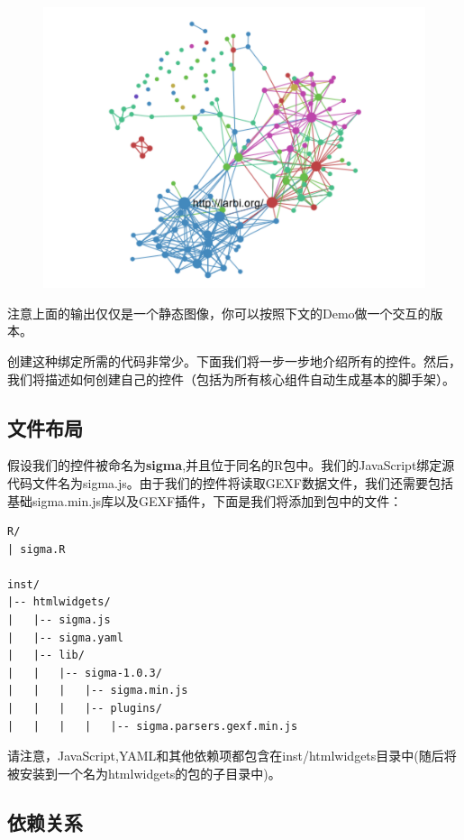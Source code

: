 \documentclass[]{book}
\theoremstyle{definition}
\theoremstyle{definition}
\theoremstyle{definition}
\theoremstyle{remark}
\begin{document}
\begin{figure}
\centering
\includegraphics{pic/ch1_1.png}
\caption{}
\end{figure}

注意上面的输出仅仅是一个静态图像，你可以按照下文的Demo做一个交互的版本。

创建这种绑定所需的代码非常少。下面我们将一步一步地介绍所有的控件。然后，我们将描述如何创建自己的控件（包括为所有核心组件自动生成基本的脚手架）。

\subsection{文件布局}

假设我们的控件被命名为\textbf{sigma},并且位于同名的R包中。我们的JavaScript绑定源代码文件名为sigma.js。由于我们的控件将读取GEXF数据文件，我们还需要包括基础sigma.min.js库以及GEXF插件，下面是我们将添加到包中的文件：

\begin{verbatim}
R/
| sigma.R

inst/
|-- htmlwidgets/
|   |-- sigma.js
|   |-- sigma.yaml
|   |-- lib/
|   |   |-- sigma-1.0.3/
|   |   |   |-- sigma.min.js
|   |   |   |-- plugins/
|   |   |   |   |-- sigma.parsers.gexf.min.js
\end{verbatim}

请注意，JavaScript,YAML和其他依赖项都包含在inst/htmlwidgets目录中(随后将被安装到一个名为htmlwidgets的包的子目录中)。

\subsection{依赖关系}
\end{document}
